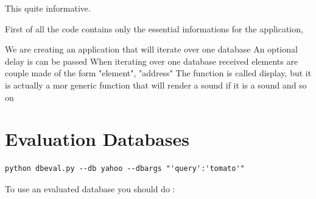 \documentclass{report}
\begin{document}
This quite informative.

First of all the code contains only the essential informations for the application,


 We are creating an application that will iterate over one database 
 An optional delay is can be passed  
 When iterating over one database received elements are couple made of the form "element", "address"  
 The function is called display, but it is actually a mor generic function that will render a sound if it is a sound and so on 






\section{Evaluation Databases}
\begin{lstlisting}
python dbeval.py --db yahoo --dbargs "'query':'tomato'"

\end{lstlisting}









To use an evaluated database you should do :
\end{document}
